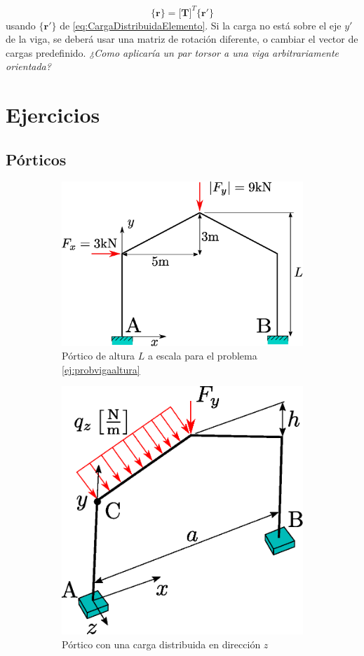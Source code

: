 \documentclass[11pt, a4paper,titlepage]{article}
\newcommand{\Mme}[1]{\boldsymbol{[}\mathbf{#1} \boldsymbol{]}}
\newcommand{\Cme}[1]{\boldsymbol{\{ }\mathbf{#1} \boldsymbol{\}} }
\begin{document}
\begin{equation}
	\Cme{r}= \Mme{T}^T \Cme{r'}
\end{equation}
usando $\Cme{r'}$ de \eqref{eq:CargaDistribuidaElemento}. Si la carga no está sobre el eje $y'$ de la viga, se deberá usar una matriz de rotación diferente, o cambiar el vector de cargas predefinido. \textit{¿Como aplicaría un par torsor a una viga arbitrariamente orientada?}
 \clearpage
\section{Ejercicios}
\subsection*{Pórticos}

\begin{figure}[htb!]
	\centering
	\begin{subfigure}{0.49\linewidth}
		\centering
		\includegraphics[width=1\textwidth]{fig/ej1viga.eps}
		\caption{Pórtico de altura $L$ a escala para el problema \ref{ej:probvigaaltura} }
		\label{fig:ej1viga}
	\end{subfigure}
	\begin{subfigure}{0.49\linewidth}
		\centering
	\includegraphics[width=.663\textwidth]{fig/ej2viga.eps}
	\caption{Pórtico con una carga distribuida en dirección $z$}
	\label{fig:ej2viga}
	\end{subfigure}
\caption{}
\label{fig:ejPorticos}
\end{figure}
\end{document}
